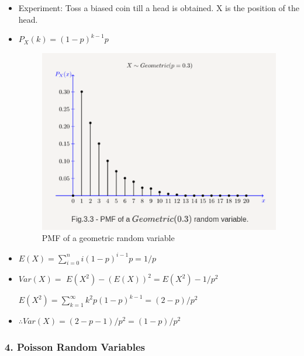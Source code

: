\begin{itemize}
\item
  Experiment: Toss a biased coin till a head is obtained. X is the
  position of the head.
\item
  \(P_X(k) = (1-p)^{k-1}p\)

  \begin{figure}[''h!'']
  \centering
  \includegraphics{Lecture 13 Notes e842fef9a3e0449fa78bac59b75dbc5c/Screenshot_from_2021-08-06_23-12-50.png}
  \caption{PMF of a geometric random variable}
  \end{figure}
\item
  \(E(X) = \displaystyle\sum_{i=0}^{n}i(1-p)^{i-1}p = 1/p\)
\item
  \(Var(X) =\) \(E(X^2) - (E(X))^2=E(X^2) -1/p^2\)

  \(E(X^2) = \displaystyle\sum_{k=1}^{\infty}k^2p(1-p)^{k-1}=(2-p)/p^2\)
\item
  \(\therefore Var(X) = (2-p-1)/p^2 = (1-p)/p^2\)
\end{itemize}

\hypertarget{poisson-random-variables}{%
\subsubsection{4. Poisson Random
Variables}\label{poisson-random-variables}}

